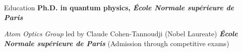 \begin{rubric}{Education}
%
%
\entry*[2004-2008]%
\textbf{Ph.D. in  quantum physics, \textit{\'Ecole Normale sup\'erieure de Paris}} 
\par{
\textit{Atom Optics Group} led by Claude Cohen-Tannoudji (Nobel Laureate)
}
%
%
%
%
\entry*[2001-2005]%
\textbf{\textit{\'Ecole Normale sup\'erieure de Paris}} (Admission through competitive exams)
%
%
\end{rubric}

